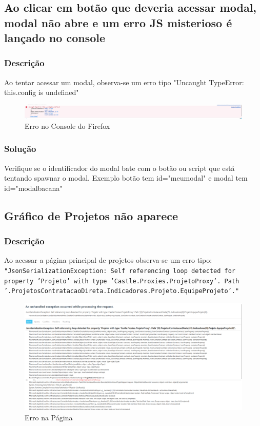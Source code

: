 \documentclass[12pt]{article}
\begin{document}
\subsection{Ao clicar em botão que deveria acessar modal, modal não abre e um erro JS misterioso é lançado no console}
\subsubsection{Descrição}
Ao tentar acessar um modal, observa-se um erro tipo "Uncaught TypeError: this.\textunderscore config is undefined"

\begin{figure}[h!]
	\includegraphics[width=\linewidth]{Imagens/modalerror.png}
	\caption{Erro no Console do Firefox}
\end{figure}

\subsubsection{Solução}
Verifique se o identificador do modal bate com o botão ou script que está tentando spawnar o modal. Exemplo botão tem id="meumodal" e modal tem id="modalbacana"

\subsection{Gráfico de Projetos não aparece}
\subsubsection{Descrição}
Ao acessar a página principal de projetos observa-se um erro tipo:\linebreak
\texttt{"JsonSerializationException: Self referencing loop detected for property 'Projeto' with type 'Castle.Proxies.ProjetoProxy'. Path '.ProjetosContratacaoDireta.Indicadores.Projeto.EquipeProjeto'."}

\begin{figure}[h!]
	\includegraphics*[width=\linewidth]{Imagens/errograficoprojetos.png}
	\caption{Erro na Página}
\end{figure}
\end{document}

